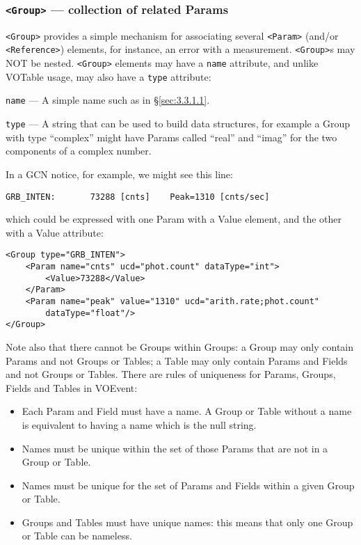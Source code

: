 \documentclass[11pt,a4paper]{ivoa}
\begin{document}
\subsubsection{\texttt{<Group>} --- collection of related Params}
\label{sec:3.3.2}
\texttt{<Group>} provides a simple mechanism for associating several \texttt{<Param>} 
(and/or \texttt{<Reference>}) elements, for instance, an error with a measurement. 
\texttt{<Group>}s may NOT be nested. \texttt{<Group>} elements may have a \texttt{name} 
attribute, and unlike VOTable usage, may also have a \texttt{type} attribute: 

 \texttt{name}\label{sec:3.3.2.1} --- A simple name such as 
in \S\ref{sec:3.3.1.1}. 

 \texttt{type}\label{sec:3.3.2.2} --- A string that can be 
used to build data structures, for example a Group with type ``complex'' might 
have Params called ``real'' and ``imag'' for the two components of a complex 
number. 

In a GCN notice, for example, we might see this line:
\begin{lstlisting}
GRB_INTEN:       73288 [cnts]    Peak=1310 [cnts/sec]
\end{lstlisting}
which could be expressed with one Param with a Value element, and the other with
a Value attribute:
\begin{lstlisting}
<Group type="GRB_INTEN">
    <Param name="cnts" ucd="phot.count" dataType="int">
        <Value>73288</Value>
    </Param>
    <Param name="peak" value="1310" ucd="arith.rate;phot.count"
        dataType="float"/>
</Group>
\end{lstlisting}
Note also that there cannot be Groups within Groups: a Group may only contain
Params and not Groups or Tables; a Table may only contain Params and Fields and
not Groups or Tables. There are rules of uniqueness for Params, Groups, Fields
and Tables in VOEvent:
\begin{itemize}
\item Each Param and Field must have a name. A Group or Table without a name is
equivalent to having a name which is the null string.
\item Names must be unique within the set of those Params that are not in a
Group or Table.
\item Names must be unique for the set of Params and Fields within a given Group
or Table.
\item Groups and Tables must have unique names: this means that only one Group
or Table can be nameless.
\end{itemize}
\end{document}

